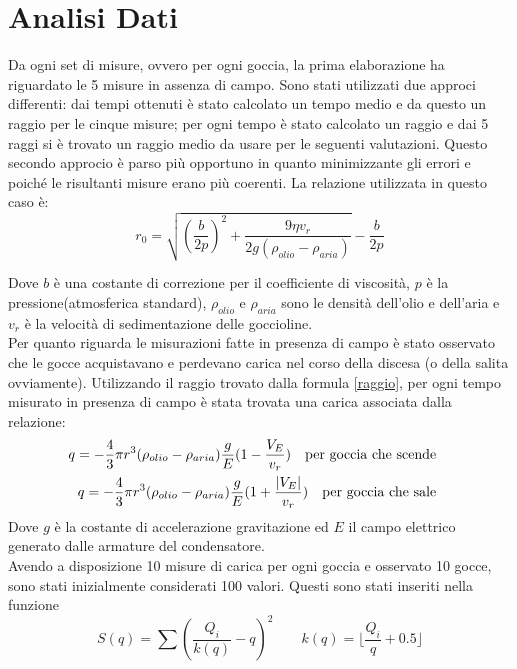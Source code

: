 \documentclass{article}
\begin{document}
    
   
\section{Analisi Dati}
    Da ogni set di misure, ovvero per ogni goccia, la prima elaborazione ha riguardato le 5 misure in assenza di campo. Sono stati utilizzati due approci differenti: dai tempi ottenuti è stato calcolato un tempo medio e da questo un raggio per le cinque misure; per ogni tempo è stato calcolato un raggio e dai 5 raggi si è trovato un raggio medio da usare per le seguenti valutazioni. Questo secondo approcio è parso più opportuno in quanto minimizzante gli errori e poiché le risultanti misure erano più coerenti. La relazione utilizzata in questo caso è:
    \begin{equation}\label{raggio}
        r_0 = \sqrt{(\frac{b}{2p})^2+\frac{9\eta v_r}{2g(\rho_{olio}-\rho_{aria})}}-\frac{b}{2p}
    \end{equation}

    Dove $b$ è una costante di correzione per il coefficiente di viscosità, $p$ è la pressione(atmosferica standard), $\rho_{olio}$ e $\rho_{aria}$ sono le densità dell'olio e dell'aria e $v_r$ è la velocità di sedimentazione delle goccioline.\\
    
    
    Per quanto riguarda le misurazioni fatte in presenza di campo è stato osservato che le gocce acquistavano e perdevano carica nel corso della discesa (o della salita ovviamente). Utilizzando il raggio trovato dalla formula \ref{raggio}, per ogni tempo misurato in presenza di campo è stata trovata una carica associata dalla relazione:
        \begin{align}\label{formula carica}
            q = -\frac{4}{3}\pi r^3(\rho_{olio}-\rho_{aria})\frac{g}{E}(1-\frac{V_E}{v_r}) \qq{per goccia che scende} \\
            q = -\frac{4}{3}\pi r^3(\rho_{olio}-\rho_{aria})\frac{g}{E}(1+ \frac{|V_E|}{v_r}) \qq{per goccia che sale}
        \end{align}
    Dove $g$ è la costante di accelerazione gravitazione ed $E$ il campo elettrico generato dalle armature del condensatore.\\
    
    Avendo a disposizione 10 misure di carica per ogni goccia e osservato 10 gocce, sono stati inizialmente considerati 100 valori. Questi sono stati inseriti nella funzione
        \begin{equation}\label{S(q)}
            S(q) = \sum (\frac{Q_i}{k(q)}-q)^2 \quad  \quad k(q) = \lfloor \frac{Q_i}{q} +0.5 \rfloor 
        \end{equation} 
        
\end{document}
